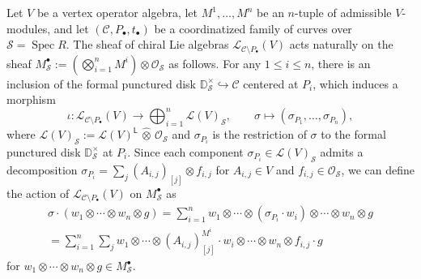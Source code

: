 \documentclass[12pt,a4paper,reqno]{amsart}
\numberwithin{equation}{section}
\theoremstyle{definition}
\renewcommand{\S}{\mathcal{S}}
\newcommand{\LL}{\mathcal{L}}
\def\O{\mathcal{O}}
\def\L{\mathsf{L}}
\begin{document}
Let $V$ be a vertex operator algebra, let $M^1, \dots, M^n$ be an $n$-tuple of admissible $V$-modules, and let $(\mathscr{C}, P_\bullet, t_\bullet)$ be a coordinatized family of curves over $\S = \operatorname{Spec}R$. The sheaf of chiral Lie algebras $\mathcal{L}_{\mathscr{C} \setminus P_\bullet}(V)$ acts naturally on the sheaf $M^\bullet_\S := \left(\bigotimes_{i=1}^n M^i\right) \otimes \O_\S$ as follows. For any $1 \le i \le n$, there is an inclusion of the formal punctured disk $\mathbb{D}^\times_\S \hookrightarrow \mathscr{C}$ centered at $P_i$, which induces a morphism
\[
\iota: \mathcal{L}_{\mathscr{C} \setminus P_\bullet}(V) \longrightarrow \bigoplus_{i=1}^n \mathcal{L}(V)_{\S}, \qquad \sigma \mapsto (\sigma_{P_1}, \dots, \sigma_{P_n}),
\]
where $\LL(V)_{\S}:=\LL(V)^\L\, \hat{\otimes}\, \O_{\S}$ and $\sigma_{P_i}$ is the restriction of $\sigma$ to the formal punctured disk $\mathbb{D}^\times_{\S}$ at $P_i$.
Since each component $\sigma_{P_i} \in \mathcal{L}(V)_{\S}$ admits a decomposition $\sigma_{P_i} = \sum_{j} (A_{i,j})_{[j]} \otimes f_{i,j}$ for $A_{i,j}\in V$ and $f_{i,j}\in \O_{\S}$, we can define the action of $\mathcal{L}_{\mathscr{C} \setminus P_\bullet}(V)$ on $M^\bullet_\S$ as
\begin{equation}\label{chiralLieact}
\begin{split}
    \sigma \cdot (w_1 \otimes\cdots\otimes w_n \otimes g) = \sum_{i=1}^n w_1 \otimes\cdots\otimes (\sigma_{P_i} \cdot w_i) \otimes\cdots\otimes w_n \otimes g \\
    = \sum_{i=1}^n \sum_{j} w_1 \otimes\cdots\otimes \left(A_{i,j}\right)^{M^i}_{[j]}\cdot w_i \otimes\cdots\otimes w_n \otimes f_{i,j}\cdot g
\end{split}
\end{equation}
for $w_1 \otimes\cdots\otimes w_n \otimes g \in M^\bullet_\S$.
\end{document}
